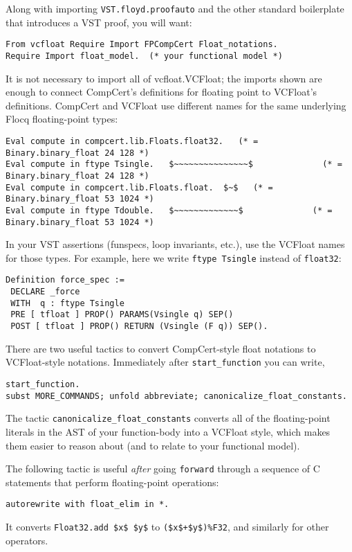 \documentclass[article]{memoir}
\begin{document}
Along with importing \lstinline{VST.floyd.proofauto} and
the other standard boilerplate that introduces a VST proof,
you will want:

\begin{lstlisting}
From vcfloat Require Import FPCompCert Float_notations.
Require Import float_model.  (* your functional model *)
\end{lstlisting}

It is not necessary to import all of vcfloat.VCFloat; the imports shown
are enough to connect CompCert's definitions for floating point
to VCFloat's definitions.  CompCert and VCFloat use different names
for the same underlying Flocq floating-point types:

\begin{lstlisting}
Eval compute in compcert.lib.Floats.float32.   (* = Binary.binary_float 24 128 *)
Eval compute in ftype Tsingle.   $~~~~~~~~~~~~~~~$              (* = Binary.binary_float 24 128 *)
Eval compute in compcert.lib.Floats.float.  $~$   (* = Binary.binary_float 53 1024 *)
Eval compute in ftype Tdouble.   $~~~~~~~~~~~~~$              (* = Binary.binary_float 53 1024 *)
\end{lstlisting}

In your VST assertions (funspecs, loop invariants,
etc.), use the VCFloat names for those types.
For example, here we write \lstinline{ftype Tsingle} instead of
\lstinline{float32}:

\begin{lstlisting}
Definition force_spec :=
 DECLARE _force
 WITH  q : ftype Tsingle
 PRE [ tfloat ] PROP() PARAMS(Vsingle q) SEP()
 POST [ tfloat ] PROP() RETURN (Vsingle (F q)) SEP().
\end{lstlisting}

There are two useful tactics to convert CompCert-style float notations to VCFloat-style notations.  Immediately after \lstinline{start_function} you
can write,

\begin{lstlisting}
start_function.
subst MORE_COMMANDS; unfold abbreviate; canonicalize_float_constants.
\end{lstlisting}

The tactic \lstinline{canonicalize_float_constants} converts
all of the floating-point literals in the AST of your function-body
into a VCFloat style, which makes them easier to reason about
(and to relate to your functional model).

The following tactic is useful \emph{after} going \lstinline{forward}
through a sequence of C statements that perform floating-point
operations:
\begin{lstlisting}
autorewrite with float_elim in *.
\end{lstlisting}
It converts \lstinline{Float32.add $x$ $y$} to \lstinline{($x$+$y$)%F32},
  and similarly for other operators.
\end{document}
